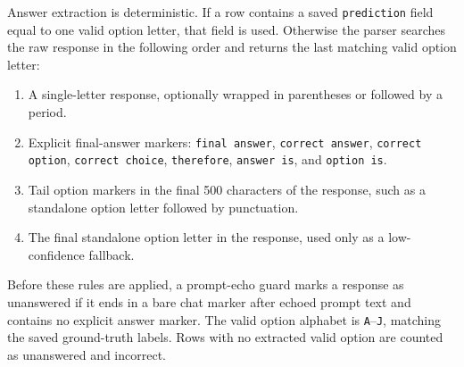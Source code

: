 \documentclass[manuscript, screen, review, nonacm]{jair}
\begin{document}
Answer extraction is deterministic. If a row contains a saved \texttt{prediction} field equal to one valid option letter, that field is used. Otherwise the parser searches the raw response in the following order and returns the last matching valid option letter:

\begin{enumerate}
  \item A single-letter response, optionally wrapped in parentheses or followed by a period.
  \item Explicit final-answer markers: \texttt{final answer}, \texttt{correct answer}, \texttt{correct option}, \texttt{correct choice}, \texttt{therefore}, \texttt{answer is}, and \texttt{option is}.
  \item Tail option markers in the final 500 characters of the response, such as a standalone option letter followed by punctuation.
  \item The final standalone option letter in the response, used only as a low-confidence fallback.
\end{enumerate}

Before these rules are applied, a prompt-echo guard marks a response as unanswered if it ends in a bare chat marker after echoed prompt text and contains no explicit answer marker. The valid option alphabet is \texttt{A}--\texttt{J}, matching the saved ground-truth labels. Rows with no extracted valid option are counted as unanswered and incorrect.
\end{document}
